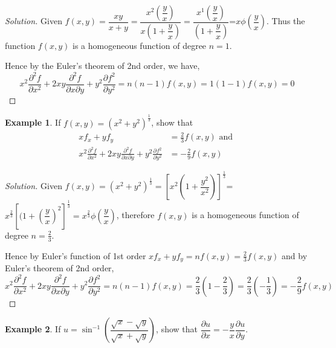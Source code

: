 \documentclass[../../main.tex]{subfiles}
\theoremstyle{definition}
\newtheorem{example}{Example}[section]
\newenvironment{solution}
    {\begin{proof}[Solution]}
    {\end{proof}}
\begin{document}
\begin{solution}
Given $f(x,y)=\dfrac{xy}{x+y}=\dfrac{x^2(\dfrac{y}{x})}{x(1+\dfrac{y}{x})}=\dfrac{x^1(\dfrac{y}{x})}{(1+\dfrac{y}{x})}$=$x\phi(\dfrac{y}{x})$. Thus the function $f(x,y)$ is a homogeneous function of degree $n=1$.

Hence by the Euler's theorem of 2nd order, we have,
\[
x^2\frac{\partial^2f}{\partial x^2}+2xy\frac{\partial^2f}{\partial x\partial y}+y^2\frac{\partial f^2}{\partial y^2}=n(n-1)f(x,y)=1(1-1)f(x,y)=0
\]
\end{solution}

\begin{example}
If $f(x,y)=(x^2+y^2)^{\frac{1}{3}}$, show that
\begin{align*}
    xf_x+yf_y &= \frac{2}{3}f(x,y) \text{ and } \\
    x^2\frac{\partial^2f}{\partial x^2}+2xy\frac{\partial^2f}{\partial x\partial y}+y^2\frac{\partial f^2}{\partial y^2} &= -\frac{2}{9}f(x,y)
\end{align*}
\end{example}

\begin{solution}
Given $f(x,y)=(x^2+y^2)^{\frac{1}{3}}=\left[x^2(1+\dfrac{y^2}{x^2})\right]^{\frac{1}{3}}$=$x^{\frac{2}{3}}\left[(1+(\dfrac{y}{x})^2\right]^{\frac{1}{3}}=x^{\frac{2}{3}}\phi(\dfrac{y}{x})$, therefore $f(x,y)$ is a homogeneous function of degree $n=\frac{2}{3}$.    

Hence by Euler's function of 1st order $xf_x+yf_y=nf(x,y)=\frac{2}{3}f(x,y)$ and by Euler's theorem of 2nd order, 
\[
x^2\frac{\partial^2f}{\partial x^2}+2xy\frac{\partial^2f}{\partial x\partial y}+y^2\frac{\partial f^2}{\partial y^2}=n(n-1)f(x,y)=\frac{2}{3}(1-\frac{2}{3})=\frac{2}{3}(-\frac{1}{3})=-\frac{2}{9}f(x,y)
\]
\end{solution}

\begin{example}
If $u=\sin^{-1} (\dfrac{\sqrt{x}-\sqrt{y}}{\sqrt{x}+\sqrt{y}})$, show that $\dfrac{\partial u}{\partial x}=-\dfrac{y}{x}\dfrac{\partial u}{\partial y}$.
\end{example}
\end{document}
